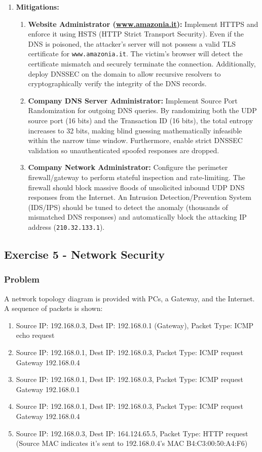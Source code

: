 \documentclass{article}
\begin{document}
\begin{enumerate}
    \item[\textbf{2.}] \textbf{Mitigations:}
    \begin{enumerate}
        \item[\textbf{a)}] \textbf{Website Administrator (\url{www.amazonia.it}):} Implement HTTPS and enforce it using HSTS (HTTP Strict Transport Security). Even if the DNS is poisoned, the attacker's server will not possess a valid TLS certificate for \texttt{www.amazonia.it}. The victim's browser will detect the certificate mismatch and securely terminate the connection. Additionally, deploy DNSSEC on the domain to allow recursive resolvers to cryptographically verify the integrity of the DNS records.
        \item[\textbf{b)}] \textbf{Company DNS Server Administrator:} Implement Source Port Randomization for outgoing DNS queries. By randomizing both the UDP source port (16 bits) and the Transaction ID (16 bits), the total entropy increases to 32 bits, making blind guessing mathematically infeasible within the narrow time window. Furthermore, enable strict DNSSEC validation so unauthenticated spoofed responses are dropped.
        \item[\textbf{c)}] \textbf{Company Network Administrator:} Configure the perimeter firewall/gateway to perform stateful inspection and rate-limiting. The firewall should block massive floods of unsolicited inbound UDP DNS responses from the Internet. An Intrusion Detection/Prevention System (IDS/IPS) should be tuned to detect the anomaly (thousands of mismatched DNS responses) and automatically block the attacking IP address (\texttt{210.32.133.1}).
    \end{enumerate}
\end{enumerate}

\subsection{Exercise 5 - Network Security}
\subsubsection*{Problem}
A network topology diagram is provided with PCs, a Gateway, and the Internet. A sequence of packets is shown:
\begin{enumerate}
    \item Source IP: 192.168.0.3, Dest IP: 192.168.0.1 (Gateway), Packet Type: ICMP echo request
    \item Source IP: 192.168.0.1, Dest IP: 192.168.0.3, Packet Type: ICMP request Gateway 192.168.0.4
    \item Source IP: 192.168.0.1, Dest IP: 192.168.0.3, Packet Type: ICMP request Gateway 192.168.0.1
    \item Source IP: 192.168.0.1, Dest IP: 192.168.0.3, Packet Type: ICMP request Gateway 192.168.0.4
    \item Source IP: 192.168.0.3, Dest IP: 164.124.65.5, Packet Type: HTTP request (Source MAC indicates it's sent to 192.168.0.4's MAC B4:C3:00:50:A4:F6)
\end{enumerate}
\end{document}
